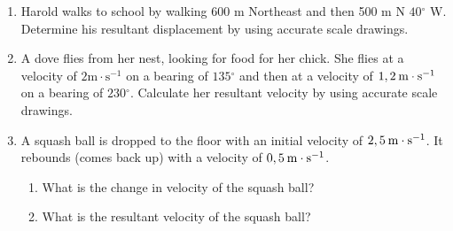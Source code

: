           \label{m38816*id191353}\begin{enumerate}[noitemsep, label=\textbf{\arabic*}. ] 
            \label{m38816*uid60}\item Harold walks to school by walking 600 m Northeast and then 500 m N \begin{math}40{}^{\circ }\end{math} W. Determine his resultant displacement by using accurate scale drawings.\newline
            
\label{m38816*uid61}\item A dove flies from her nest, looking for food for her chick. She flies at a velocity of \begin{math}2\mathrm{m}\ensuremath{\cdot}\mathrm{s}{}^{-1}\end{math} on a bearing of \begin{math}135{}^{\circ }\end{math} and then at a velocity of \begin{math}1,2\phantom{\rule{2pt}{0ex}}\mathrm{m}\ensuremath{\cdot}\mathrm{s}{}^{-1}\end{math} on a bearing of \begin{math}230{}^{\circ }\end{math}. Calculate her resultant velocity by using accurate scale drawings.\newline
            
\label{m38816*uid62}\item A squash ball is dropped to the floor with an initial velocity of \begin{math}2,5\phantom{\rule{2pt}{0ex}}\mathrm{m}\ensuremath{\cdot}\mathrm{s}{}^{-1}\end{math}. It rebounds (comes back up) with a velocity of \begin{math}0,5\phantom{\rule{2pt}{0ex}}\mathrm{m}\ensuremath{\cdot}\mathrm{s}{}^{-1}\end{math}.
\label{m38816*id191536}\begin{enumerate}[noitemsep, label=\textbf{\alph*}. ] 
            \label{m38816*uid63}\item What is the change in velocity of the squash ball?
\label{m38816*uid64}\item What is the resultant velocity of the squash ball?
\end{enumerate}
                \end{enumerate}
        
          

